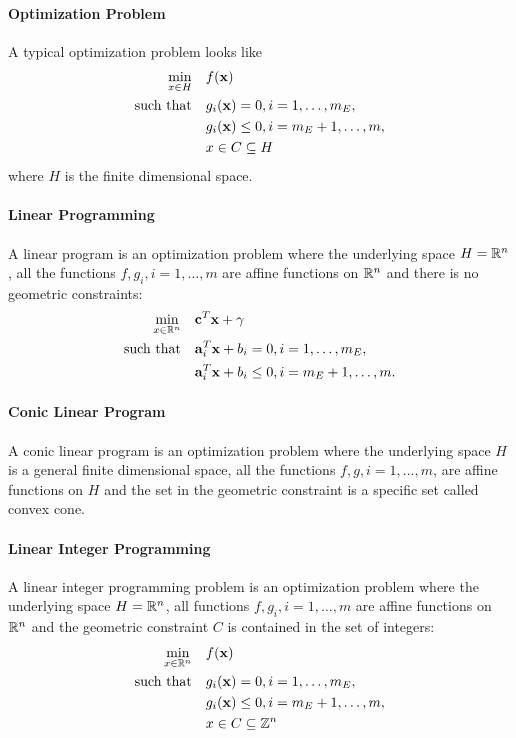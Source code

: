 \paragraph{Optimization Problem} A typical optimization problem looks like
\begin{align*}
    \min_{x \in H} \quad    & f(\mathbf{x})                                  \\
    \text{such that}  \quad & g_i(\mathbf{x}) = 0, i = 1, \dots, m_E,        \\
                            & g_i(\mathbf{x}) \leq 0, i = m_E + 1, \dots, m, \\
                            & x \in C \subseteq H
\end{align*}
where \(H\) is the finite dimensional space.

\paragraph{Linear Programming} A linear program is an optimization problem where the underlying space \(H = \mathbb{R}^n\), all the functions \(f, g_i, i = 1, \dots, m\) are affine functions on \(\mathbb{R}^n\) and there is no geometric constraints:
\begin{align*}
    \min_{x \in \mathbb{R}^n} \quad & \mathbf{c}^T \mathbf{x} + \gamma                               \\
    \text{such that}\quad    & \mathbf{a}_i^T \mathbf{x} + b_i = 0, i = 1, \dots, m_E,        \\
                             & \mathbf{a}_i^T \mathbf{x} + b_i \leq 0, i = m_E + 1, \dots, m.
\end{align*}

\paragraph{Conic Linear Program} A conic linear program is an optimization problem where the underlying space \(H\) is a general finite dimensional space, all the functions \(f, g, i = 1, \dots, m\), are affine functions on \(H\) and the set in the geometric constraint is a specific set called convex cone.

\paragraph{Linear Integer Programming} A linear integer programming problem is an optimization problem where the underlying space \(H = \mathbb{R}^n\), all functions \(f, g_i, i = 1, \dots, m\) are affine functions on \(\mathbb{R}^n\) and the geometric constraint \(C\) is contained in the set of integers:
\begin{align*}
    \min_{x \in \mathbb{R}^n} \quad & f(\mathbf{x})                                  \\
    \text{such that}  \quad  & g_i(\mathbf{x}) = 0, i = 1, \dots, m_E,        \\
                             & g_i(\mathbf{x}) \leq 0, i = m_E + 1, \dots, m, \\
                             & x \in C \subseteq \mathbb{Z}^n
\end{align*}
